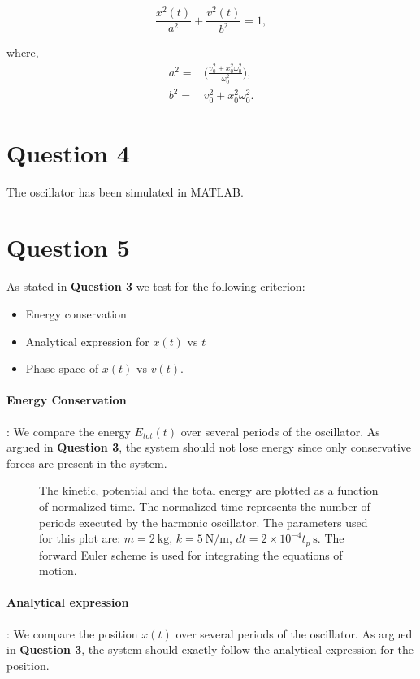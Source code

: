 \documentclass[10pt]{article}
\begin{document}
\begin{equation}
\frac{x^2(t)}{a^2} + \frac{v^2(t)}{b^2} = 1,
\label{eqn:phase_space_eqn}
\end{equation}

where,
\begin{align*}
a^2 =& \Big(\frac{v_{0}^2 + x_{0}^2 \omega_{0}^2}{\omega_{0}^2}\Big),\\
b^2 =& v_{0}^2 + x_{0}^2 \omega_{0}^2.
\end{align*}

\section*{Question 4}
The oscillator has been simulated in MATLAB.

\section*{Question 5}
As stated in \textbf{Question 3} we test for the following criterion:
\begin{itemize}
\item Energy conservation
\item Analytical expression for $x(t)$ vs $t$
\item Phase space of $x(t)$ vs $v(t)$.
\end{itemize}
\paragraph{Energy Conservation}: We compare the energy $E_{tot}(t)$ over several periods of the oscillator. As argued in \textbf{Question 3}, the system should not lose energy since only conservative forces are present in the system. 

\begin{figure}[!htb]
\centering

\caption{The kinetic, potential and the total energy are plotted as a function of normalized time. The normalized time represents the number of periods executed by the harmonic oscillator. The parameters used for this plot are: $m=2\ \mathrm{kg}$, $k=5\ \mathrm{N/m}$, $dt=2\times 10^{-4}t_{p}\ \mathrm{s}$. The forward Euler scheme is used for integrating the equations of motion.}
\end{figure}

\paragraph{Analytical expression}: We compare the position $x(t)$ over several periods of the oscillator. As argued in \textbf{Question 3}, the system should exactly follow the analytical expression for the position.
\end{document}
